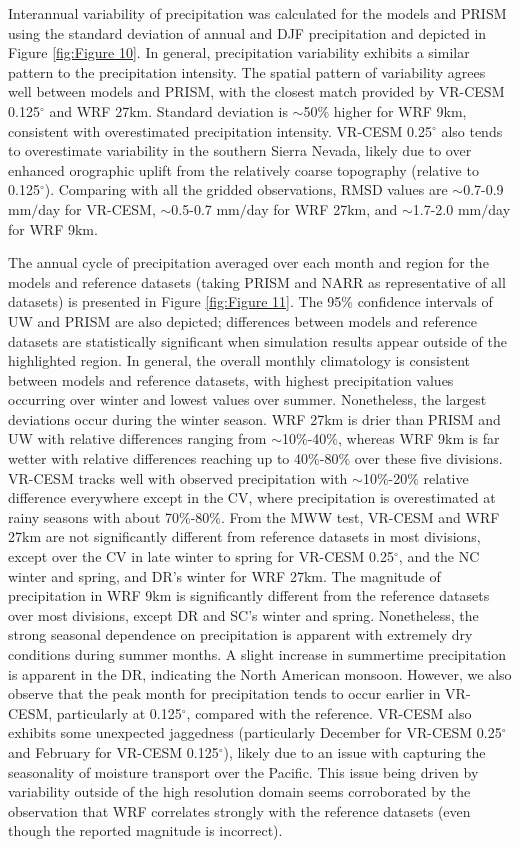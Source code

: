 \documentclass[draft,ms]{agutex}   %
\begin{document}
\begin{article}
Interannual variability of precipitation was calculated for the models and PRISM using the standard deviation of annual and DJF precipitation and depicted in Figure \ref{fig:Figure 10}. In general, precipitation variability exhibits a similar pattern to the precipitation intensity. The spatial pattern of variability agrees well between models and PRISM, with the closest match provided by VR-CESM 0.125$^\circ$ and WRF 27km. Standard deviation is $\sim$50$\%$ higher for WRF 9km, consistent with overestimated precipitation intensity. VR-CESM 0.25$^\circ$ also tends to overestimate variability in the southern Sierra Nevada, likely due to over enhanced orographic uplift from the relatively coarse topography (relative to 0.125$^\circ$). Comparing with all the gridded observations, RMSD values are $\sim$0.7-0.9 mm$/$day for VR-CESM, $\sim$0.5-0.7 mm$/$day for WRF 27km, and $\sim$1.7-2.0 mm$/$day for WRF 9km.


The annual cycle of precipitation averaged over each month and region for the models and reference datasets (taking PRISM and NARR as representative of all datasets) is presented in Figure \ref{fig:Figure 11}. The 95\% confidence intervals of UW and PRISM are also depicted; differences between models and reference datasets are statistically significant when simulation results appear outside of the highlighted region. In general, the overall monthly climatology is consistent between models and reference datasets, with highest precipitation values occurring over winter and lowest values over summer. Nonetheless, the largest deviations occur during the winter season. WRF 27km is drier than PRISM and UW with relative differences ranging from $\sim$10$\%$-40$\%$, whereas WRF 9km is far wetter with relative differences reaching up to 40$\%$-80$\%$ over these five divisions. VR-CESM tracks well with observed precipitation with $\sim$10$\%$-20$\%$ relative difference everywhere except in the CV, where precipitation is overestimated at rainy seasons with about 70$\%$-80$\%$. From the MWW test, VR-CESM and WRF 27km are not significantly different from reference datasets in most divisions, except over the CV in late winter to spring for VR-CESM 0.25$^\circ$, and the NC winter and spring, and DR's winter for WRF 27km. The magnitude of precipitation in WRF 9km is significantly different from the reference datasets over most divisions, except DR and SC's winter and spring. Nonetheless, the strong seasonal dependence on precipitation is apparent with extremely dry conditions during summer months. A slight increase in summertime precipitation is apparent in the DR, indicating the North American monsoon. However, we also observe that the peak month for precipitation tends to occur earlier in VR-CESM, particularly at 0.125$^\circ$, compared with the reference. VR-CESM also exhibits some unexpected jaggedness (particularly December for VR-CESM 0.25$^\circ$ and February for VR-CESM 0.125$^\circ$), likely due to an issue with capturing the seasonality of moisture transport over the Pacific. This issue being driven by variability outside of the high resolution domain seems corroborated by the observation that WRF correlates strongly with the reference datasets (even though the reported magnitude is incorrect).


\end{article}
\end{document}
